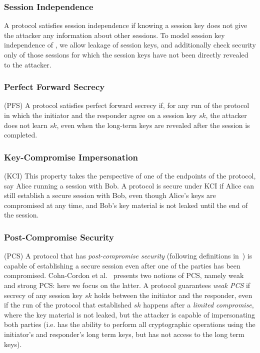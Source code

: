 \spacehack
\subsubsection{Session Independence}
A protocol satisfies session independence if knowing a session key does
not give the attacker any information about other sessions.  To model session
key independence of \mEdhoc, we allow leakage of session keys, and additionally
check security only of those sessions for which the session keys have not been
directly revealed to the attacker.

\spacehack
\subsubsection{Perfect Forward Secrecy} (PFS) A protocol satisfies perfect forward
secrecy if, for any run of the protocol in which the initiator and the responder
agree on a session key $sk$, the attacker does not learn $sk$, even when the
long-term keys are revealed after the session is completed.

\spacehack
\subsubsection{Key-Compromise Impersonation} (KCI) This property takes the perspective of one
of the endpoints of the protocol, say Alice running a session with Bob. A
protocol is secure under KCI if Alice can still establish a secure session with
Bob, even though Alice's keys are compromised at any time, and Bob's key
material is not leaked until the end of the session.

\spacehack
\subsubsection{Post-Compromise Security} (PCS) A protocol that has
\emph{post-compromise security} (following definitions in~\cite{cohn2016post})
is capable of establishing a secure session even after one of the parties has
been compromised. Cohn-Cordon et al.~\cite{cohn2016post} presents two notions of
PCS, namely weak and strong PCS: here we focus on the latter.
%
A protocol guarantees \emph{weak PCS} if secrecy of any session key $sk$ holds
between the initiator and the responder, even if the run of the protocol that
established $sk$ happens after a \emph{limited compromise}, where the key
material is not leaked, but the attacker is capable of impersonating both
parties (i.e. has the ability to perform all cryptographic operations using the
initiator's and responder's long term keys, but has not access to the long term
keys).

